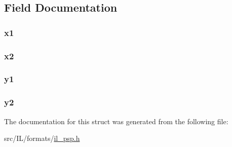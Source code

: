 \subsection{Field Documentation}
\hypertarget{struct_p_s_p_r_e_c_t_a66a90885c014c3dc68c9f9dd1e9c6c38}{
\subsubsection[{x1}]{ x1}}\label{struct_p_s_p_r_e_c_t_a66a90885c014c3dc68c9f9dd1e9c6c38}
\hypertarget{struct_p_s_p_r_e_c_t_a78f3fc154228f9ee0311d37c443ffebb}{
\subsubsection[{x2}]{ x2}}\label{struct_p_s_p_r_e_c_t_a78f3fc154228f9ee0311d37c443ffebb}
\hypertarget{struct_p_s_p_r_e_c_t_ade1fcf69431541dd81f258cf4908dc2f}{
\subsubsection[{y1}]{ y1}}\label{struct_p_s_p_r_e_c_t_ade1fcf69431541dd81f258cf4908dc2f}
\hypertarget{struct_p_s_p_r_e_c_t_a8ead91f87da3835544e63fe192278608}{
\subsubsection[{y2}]{ y2}}\label{struct_p_s_p_r_e_c_t_a8ead91f87da3835544e63fe192278608}


The documentation for this struct was generated from the following file\-:\begin{DoxyCompactItemize}
\item 
src/\-I\-L/formats/\hyperlink{il__psp_8h}{il\-\_\-psp.\-h}\end{DoxyCompactItemize}
